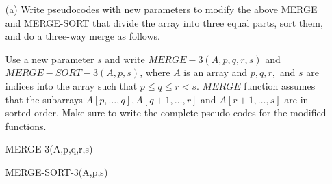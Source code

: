 \documentclass[12pt]{article}
\begin{document}
\begin{itemize}
\item[(a)] Write pseudocodes with new parameters to modify the above MERGE and MERGE-SORT  that divide the array into three equal parts, sort them, and do a three-way merge as follows. 

Use a new parameter $s$ and write 
   $MERGE-3(A, p, q, r, s)$ and $MERGE-SORT-3(A, p, s)$, where $A$ is an array and $p, q, r,$ and $s$ are indices into the array such that $p \leq q \leq r < s.$ $MERGE$ function assumes that the subarrays $A[p, \ldots, q], A[q+1, \ldots, r]$ and $A[r+1, \ldots, s]$ are in sorted order.
Make sure to write the complete pseudo codes for the modified functions.


\begin{algorithm}
\caption{MERGE-3(A,p,q,r,s)}
\begin{algorithmic}[1]

\EndFor
{}
\EndFor
{}
\EndFor

 


    \Else
    \EndIf
\EndFor
\end{algorithmic}
\end{algorithm}
\begin{algorithm}

\caption{MERGE-SORT-3(A,p,s)}
\begin{algorithmic}[1]
     
     
    
    
\EndIf
\end{algorithmic}
\end{algorithm}


\end{itemize}
\end{document}
